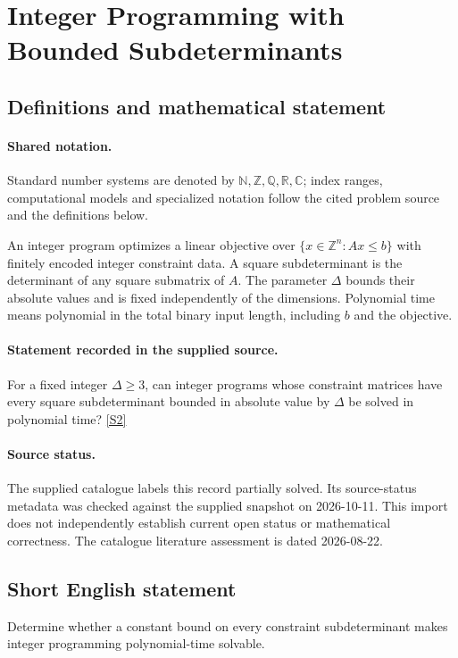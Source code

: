 \documentclass[11pt]{article}
\newcommand{\sref}[2]{\hyperlink{source:#1:#2}{[S#2]}}
\begin{document}
\section{Integer Programming with Bounded Subdeterminants}\label{statement}

\subsection{Definitions and mathematical statement}

\paragraph{Shared notation.}Standard number systems are denoted by $\mathbb N,\mathbb Z,\mathbb Q,\mathbb R,\mathbb C$; index ranges, computational models and specialized notation follow the cited problem source and the definitions below.


An integer program optimizes a linear objective over $\{x\in\mathbb Z^n:Ax\leq b\}$ with finitely encoded integer constraint data. A square subdeterminant is the determinant of any square submatrix of $A$. The parameter $\Delta$ bounds their absolute values and is fixed independently of the dimensions. Polynomial time means polynomial in the total binary input length, including $b$ and the objective.
\paragraph{Statement recorded in the supplied source.}
For a fixed integer $\Delta\geq3$, can integer programs whose constraint matrices have every square subdeterminant bounded in absolute value by $\Delta$ be solved in polynomial time? \sref{statement}{2}
\paragraph{Source status.}
The supplied catalogue labels this record partially solved. Its source-status metadata was checked against the supplied snapshot on 2026-10-11. This import does not independently establish current open status or mathematical correctness. The catalogue literature assessment is dated 2026-08-22.
\subsection{Short English statement}
Determine whether a constant bound on every constraint subdeterminant makes integer programming polynomial-time solvable.
\end{document}
